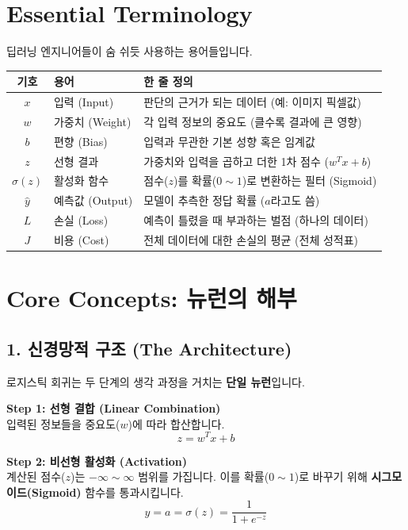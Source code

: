 \documentclass[11pt,a4paper]{book}
\theoremstyle{definition}
\begin{document}
\section{Essential Terminology}
딥러닝 엔지니어들이 숨 쉬듯 사용하는 용어들입니다.

\begin{center}
\begin{tabular}{|c|l|l|}
\hline
\textbf{기호} & \textbf{용어} & \textbf{한 줄 정의} \\ \hline
$x$ & 입력 (Input) & 판단의 근거가 되는 데이터 (예: 이미지 픽셀값) \\ \hline
$w$ & 가중치 (Weight) & 각 입력 정보의 중요도 (클수록 결과에 큰 영향) \\ \hline
$b$ & 편향 (Bias) & 입력과 무관한 기본 성향 혹은 임계값 \\ \hline
$z$ & 선형 결과 & 가중치와 입력을 곱하고 더한 1차 점수 ($w^Tx + b$) \\ \hline
$\sigma(z)$ & 활성화 함수 & 점수($z$)를 확률($0 \sim 1$)로 변환하는 필터 (Sigmoid) \\ \hline
$\hat{y}$ & 예측값 (Output) & 모델이 추측한 정답 확률 ($a$라고도 씀) \\ \hline
$L$ & 손실 (Loss) & 예측이 틀렸을 때 부과하는 벌점 (하나의 데이터) \\ \hline
$J$ & 비용 (Cost) & 전체 데이터에 대한 손실의 평균 (전체 성적표) \\ \hline
\end{tabular}
\end{center}

\section{Core Concepts: 뉴런의 해부}

\subsection{1. 신경망적 구조 (The Architecture)}
로지스틱 회귀는 두 단계의 생각 과정을 거치는 \textbf{단일 뉴런}입니다.

\textbf{Step 1: 선형 결합 (Linear Combination)} \\
입력된 정보들을 중요도($w$)에 따라 합산합니다.
$$ z = w^T x + b $$

\textbf{Step 2: 비선형 활성화 (Activation)} \\
계산된 점수($z$)는 $-\infty \sim \infty$ 범위를 가집니다. 이를 확률($0 \sim 1$)로 바꾸기 위해 \textbf{시그모이드(Sigmoid)} 함수를 통과시킵니다.
$$ \hat{y} = a = \sigma(z) = \frac{1}{1 + e^{-z}} $$
\end{document}
